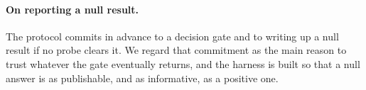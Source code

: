 \paragraph{On reporting a null result.}
The protocol commits in advance to a decision gate and to writing up a null
result if no probe clears it. We regard that commitment as the main reason to
trust whatever the gate eventually returns, and the harness is built so that a
null answer is as publishable, and as informative, as a positive one.
